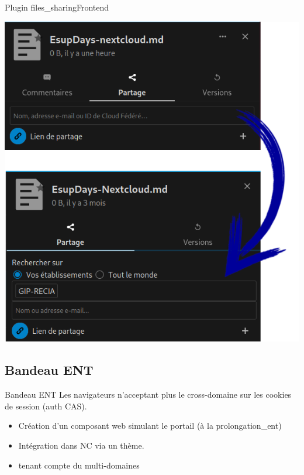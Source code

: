 \documentclass[aspectratio=169]{beamer}
\begin{document}
\begin{frame}[fragile]{Plugin files\_sharing}{Frontend}

\includegraphics[height=0.75\textheight]{filesharing.png}
\end{frame}

\subsection{Bandeau ENT}
\begin{frame}{Bandeau ENT}
Les navigateurs n'acceptant plus le cross-domaine sur les cookies de session (auth CAS).
\begin{itemize}
	\item Création d'un composant web simulant le portail (à la prolongation\_ent)
	\item Intégration dans NC via un thème.
	\item tenant compte du multi-domaines   
\end{itemize}
\end{frame}
\end{document}
